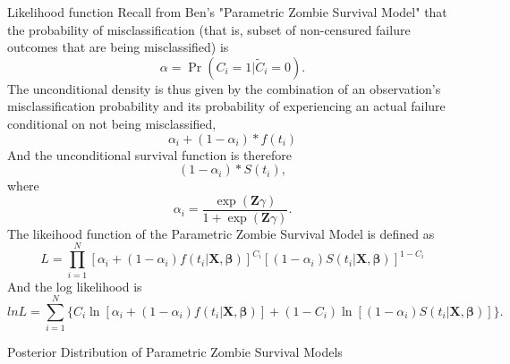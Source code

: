 \documentclass[a4paper, 12pt]{article}
\makeatletter
\newcommand {\dsum}{\displaystyle \sum}
\newcommand {\dprod}{\displaystyle \prod}
\renewcommand{\section}{\@startsection
	{section}    {1}    {0mm}    {-0.7\baselineskip}    {0.08\baselineskip}    {\normalfont\large\sc\center\bf}}
\renewcommand{\subsection}{\@startsection
	{subsection}    {2}    {0mm}    {-0.5\baselineskip}    {0.01\baselineskip}    {\normalfont\normalsize\itshape\center}}
\makeatother
\begin{document}
\subsection{Likelihood function}
\noindent Recall from Ben's "Parametric Zombie Survival Model" that the
probability of misclassification (that is, subset of non-censured failure
outcomes that are being misclassified) is%
\begin{equation}
\alpha =\Pr (C_{i}=1|\widetilde{C}_{i}=0).
\end{equation}
The unconditional density is thus given by the combination of an
observation's misclassification probability and its probability of
experiencing an actual failure conditional on not being misclassified,%
\begin{equation}
\alpha _{i}+(1-\alpha _{i})\ast f(t_{i})
\end{equation}
And the unconditional survival function is therefore%
\begin{equation}
(1-\alpha _{i})\ast S(t_{i}),
\end{equation}
where
\begin{equation}
\alpha _{i}=\frac{\exp (\mathbf{Z}\gamma )}{1+\exp (\mathbf{Z}\gamma )}.
\end{equation}
The likeihood function of the Parametric Zombie Survival Model is defined as 
\begin{equation}
L=\dprod\limits_{i=1}^{N}[\alpha _{i}+(1-\alpha _{i})f(t_{i}|\mathbf{X},\mathbf{\beta}
)]^{C_{i}}[(1-\alpha _{i})S(t_{i}|\mathbf{X,}\mathbf{\beta})]^{1-C_{i}}
\end{equation}
And the log likelihood is%
\begin{equation}
lnL=\dsum\limits_{i=1}^{N}\{C_{i}\ln [\alpha _{i}+(1-\alpha
_{i})f(t_{i}|\mathbf{X},\mathbf{\beta})]+(1-C_{i})\ln [(1-\alpha _{i})S(t_{i}|\mathbf{X,}%
\mathbf{\beta})]\}.
\end{equation}
\iffalse
Equivalently, if define $\delta = 1 - \alpha$ and substitute this quantity into Equation (6), the log-likelihood would be defined as:
\begin{equation}
lnL=\dsum\limits_{i=1}^{N}\{C_{i}\ln [(1-\delta _{i})+\delta
_{i}f(t_{i}|\mathbf{X},\mathbf{\beta})]+(1-C_{i})\ln [\delta _{i}S(t_{i}|\mathbf{X,}%
\mathbf{\beta})]\},
\end{equation}
which is symmetric to the log likelihood of the cure (i.e., split-population) survival model.
\fi
\section{Posterior Distribution of Parametric Zombie Survival Models}
\iffalse\noindent The parametric survival models, also known as accelerated failure time models (AFT models), includes exponential, log-normal, log-logistic, and Weibull distributions. Although the classical approach is the maximum likelihood for parameter estimation, here we use Bayesian analysis to model Exponential and Weibull cases.\fi
\end{document}
